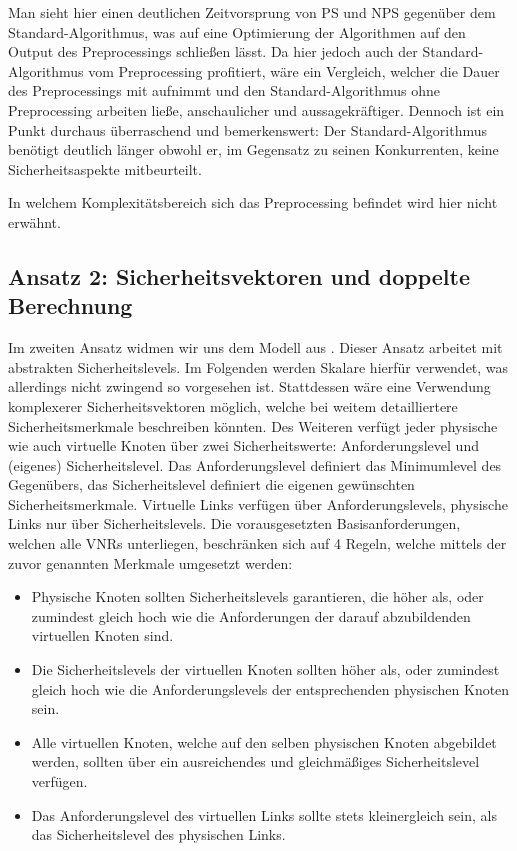 \documentclass{lni}
\begin{document}
Man sieht  hier einen deutlichen Zeitvorsprung von PS und NPS gegenüber dem Standard-Algorithmus, was auf eine Optimierung der Algorithmen auf den Output des Preprocessings schließen lässt. Da hier jedoch auch der Standard-Algorithmus vom Preprocessing profitiert, wäre ein Vergleich, welcher die Dauer des Preprocessings mit aufnimmt und den Standard-Algorithmus ohne Preprocessing arbeiten ließe, anschaulicher und aussagekräftiger.
Dennoch ist ein Punkt durchaus überraschend und bemerkenswert: Der Standard-Algorithmus benötigt deutlich länger obwohl er, im Gegensatz zu seinen Konkurrenten, keine Sicherheitsaspekte mitbeurteilt.

In welchem Komplexitätsbereich sich das Preprocessing befindet wird hier nicht erwähnt.


\subsection{Ansatz 2: Sicherheitsvektoren und doppelte Berechnung}
\label{subsec:ansatz2}

Im zweiten Ansatz widmen wir uns dem Modell aus \cite{algo2}. Dieser Ansatz arbeitet mit abstrakten Sicherheitslevels. Im Folgenden werden Skalare hierfür verwendet, was allerdings nicht zwingend so vorgesehen ist. Stattdessen wäre eine Verwendung komplexerer Sicherheitsvektoren möglich, welche bei weitem detailliertere Sicherheitsmerkmale  beschreiben könnten. Des Weiteren verfügt jeder physische wie auch virtuelle Knoten über zwei Sicherheitswerte: Anforderungslevel und (eigenes) Sicherheitslevel. Das Anforderungslevel definiert das Minimumlevel des Gegenübers, das Sicherheitslevel definiert die eigenen gewünschten Sicherheitsmerkmale. Virtuelle Links verfügen über Anforderungslevels, physische Links nur über Sicherheitslevels. Die vorausgesetzten Basisanforderungen, welchen alle VNRs unterliegen, beschränken sich auf 4 Regeln, welche mittels der zuvor genannten Merkmale umgesetzt werden:
\begin{itemize}
\item Physische Knoten sollten Sicherheitslevels garantieren, 
   die höher als, oder zumindest gleich hoch wie die Anforderungen der darauf abzubildenden
   virtuellen Knoten sind.

\item Die Sicherheitslevels der virtuellen Knoten sollten höher als, oder zumindest gleich hoch wie die Anforderungslevels der entsprechenden physischen Knoten sein.

\item Alle virtuellen Knoten, welche auf den selben physischen Knoten
   abgebildet werden, sollten über ein ausreichendes und gleichmäßiges Sicherheitslevel
   verfügen. 

\item Das Anforderungslevel des virtuellen Links sollte stets kleinergleich
   sein, als das Sicherheitslevel des physischen Links.
\end{itemize}
\end{document}
